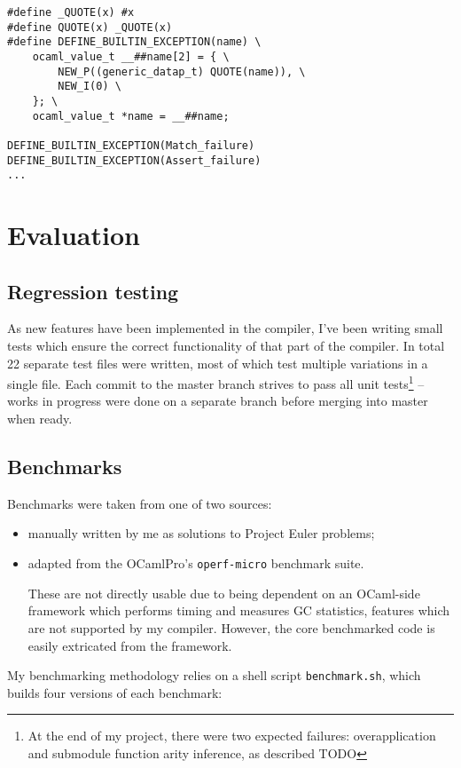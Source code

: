 \documentclass[12pt,a4paper,twoside,openright]{report}
\begin{document}
\begin{lstlisting}
#define _QUOTE(x) #x
#define QUOTE(x) _QUOTE(x)
#define DEFINE_BUILTIN_EXCEPTION(name) \
    ocaml_value_t __##name[2] = { \
        NEW_P((generic_datap_t) QUOTE(name)), \
        NEW_I(0) \
    }; \
    ocaml_value_t *name = __##name;

DEFINE_BUILTIN_EXCEPTION(Match_failure)
DEFINE_BUILTIN_EXCEPTION(Assert_failure)
...
\end{lstlisting}

\chapter{Evaluation}

\section{Regression testing}

As new features have been implemented in the compiler, I've been writing small
tests which ensure the correct functionality of that part of the compiler. In
total 22 separate test files were written, most of which test multiple
variations in a single file. Each commit to the master branch strives to pass
all unit tests\footnote{At the end of my project, there were two expected failures: overapplication and submodule function arity inference, as described TODO} -- works in progress were done on a separate branch before
merging into master when ready.

\section{Benchmarks}

Benchmarks were taken from one of two sources:

\begin{itemize}
    \item 
manually written by me as solutions to Project Euler problems;
\item adapted from the OCamlPro's \lstinline!operf-micro! benchmark suite.

    These are not directly usable due to being dependent on an OCaml-side
    framework which performs timing and measures GC statistics, features which
    are not supported by my compiler. However, the core benchmarked code is
    easily extricated from the framework.
\end{itemize}

My benchmarking methodology relies on a shell script \lstinline!benchmark.sh!,
which builds four versions of each benchmark:
\end{document}
